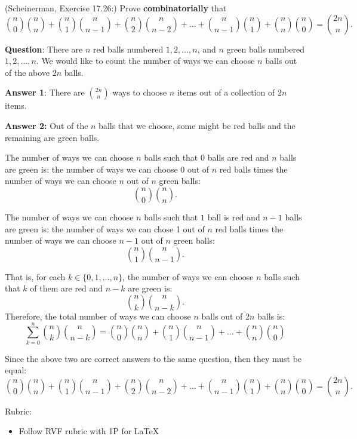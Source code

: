 \documentclass{article}
\theoremstyle{definition}
\begin{document}
\begin{question}
    (Scheinerman, Exercise 17.26:)
    Prove \textbf{combinatorially} that
    \[ \binom{n}{0}\binom{n}{n} + \binom{n}{1} \binom{n}{n-1} + \binom{n}{2}\binom{n}{n-2} + \ldots + \binom{n}{n-1}\binom{n}{1} + \binom{n}{n}\binom{n}{0} = \binom{2n}{n}. \]
\end{question}
\begin{solution}
\textbf{Question}: There are $n$ red balls numbered $1, 2, \ldots, n$, and $n$ green balls numbered $1, 2, \ldots, n$.  We would like to count the number of ways we can choose $n$ balls out of the above $2n$ balls.

\textbf{Answer 1}: There are $\binom{2n}{n}$ ways to choose $n$ items out of a collection of $2n$ items.

\textbf{Answer 2:} Out of the $n$ balls that we choose, some might be red balls and the remaining are green balls.

The number of ways we can choose $n$ balls such that $0$ balls are red and $n$ balls are green is: the number of ways we can choose 0 out of $n$ red balls times the number of ways we can choose $n$ out of $n$ green balls:
\[ \binom{n}{0} \binom{n}{n}.\]

The number of ways we can choose $n$ balls such that $1$ ball is red and $n-1$ balls are green is: the number of ways we can chose 1 out of $n$ red balls times the number of ways we can choose $n-1$ out of $n$ green balls:
\[ \binom{n}{1} \binom{n}{n-1}. \]

That is, for each $k \in \{0, 1, \ldots, n\}$, the number of ways we can choose $n$ balls such that $k$ of them are red and $n-k$ are green is:
\[ \binom{n}{k}\binom{n}{n-k}. \]
Therefore, the total number of ways we can choose $n$ balls out of $2n$ balls is:
\[ \sum_{k=0}^n \binom{n}{k}\binom{n}{n-k} = \binom{n}{0}\binom{n}{n} + \binom{n}{1} \binom{n}{n-1} + \ldots + \binom{n}{n}\binom{n}{0} \]


Since the above two are correct answers to the same question, then they must be equal:
\[ \binom{n}{0}\binom{n}{n} + \binom{n}{1} \binom{n}{n-1} + \binom{n}{2}\binom{n}{n-2} + \ldots + \binom{n}{n-1}\binom{n}{1} + \binom{n}{n}\binom{n}{0} = \binom{2n}{n}. \]

{\color{red} Rubric:
\begin{itemize}
\item Follow RVF rubric with 1P for \LaTeX
\end{itemize}}
\end{solution}
\end{document}
